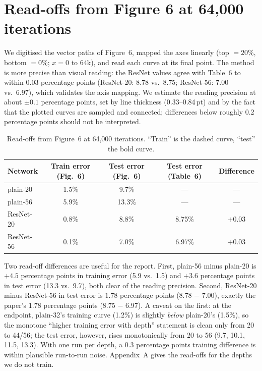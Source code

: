 \documentclass[11pt,a4paper]{article}
\newcommand{\pp}{percentage points}
\begin{document}
\section{Read-offs from Figure 6 at 64{,}000 iterations}

We digitised the vector paths of Figure~6, mapped the axes linearly (top $=20\%$, bottom $=0\%$; $x=0$ to $64$k), and read each curve at its final point. The method is more precise than visual reading: the ResNet values agree with Table~6 to within 0.03 \pp{} (ResNet-20: 8.78 vs.\ 8.75; ResNet-56: 7.00 vs.\ 6.97), which validates the axis mapping. We estimate the reading precision at about $\pm0.1$ \pp{}, set by line thickness (0.33--0.84\,pt) and by the fact that the plotted curves are sampled and connected; differences below roughly 0.2 \pp{} should not be interpreted.

\begin{table}[htbp]
\centering
\small
\caption{Read-offs from Figure~6 at 64{,}000 iterations. ``Train'' is the dashed curve, ``test'' the bold curve.}
\label{tab:readoffs}
\begin{tabular}{@{}lcccc@{}}
\toprule
\textbf{Network} & \textbf{Train error (Fig.~6)} & \textbf{Test error (Fig.~6)} & \textbf{Test error (Table~6)} & \textbf{Difference}\\
\midrule
plain-20  & 1.5\% & 9.7\%  & ---   & ---\\
plain-56  & 5.9\% & 13.3\% & ---   & ---\\
ResNet-20 & 0.8\% & 8.8\%  & 8.75\% & $+0.03$\\
ResNet-56 & 0.1\% & 7.0\%  & 6.97\% & $+0.03$\\
\bottomrule
\end{tabular}
\end{table}

Two read-off differences are useful for the report. First, plain-56 minus plain-20 is $+4.5$ \pp{} in training error (5.9 vs.\ 1.5) and $+3.6$ \pp{} in test error (13.3 vs.\ 9.7), both clear of the reading precision. Second, ResNet-20 minus ResNet-56 in test error is $1.78$ \pp{} (8.78 $-$ 7.00), exactly the paper's 1.78 \pp{} (8.75 $-$ 6.97). A caveat on the first: at the endpoint, plain-32's training curve (1.2\%) is slightly \emph{below} plain-20's (1.5\%), so the monotone ``higher training error with depth'' statement is clean only from 20 to 44/56; the test error, however, rises monotonically from 20 to 56 (9.7, 10.1, 11.5, 13.3). With one run per depth, a 0.3 \pp{} training difference is within plausible run-to-run noise. Appendix~A gives the read-offs for the depths we do not train.
\end{document}
